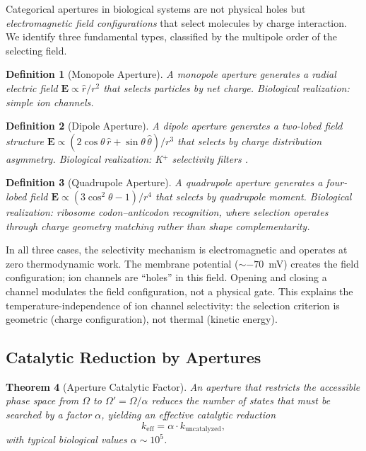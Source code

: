 \documentclass[twocolumn,10pt]{article}
\newtheorem{theorem}{Theorem}[section]
\newtheorem{definition}[theorem]{Definition}
\begin{document}
Categorical apertures in biological systems are not physical holes but \emph{electromagnetic field configurations} that select molecules by charge interaction.  We identify three fundamental types, classified by the multipole order of the selecting field.

\begin{definition}[Monopole Aperture]
A monopole aperture generates a radial electric field $\mathbf{E} \propto \hat{r}/r^{2}$ that selects particles by net charge.  Biological realization: simple ion channels.
\end{definition}

\begin{definition}[Dipole Aperture]
A dipole aperture generates a two-lobed field structure $\mathbf{E} \propto (2\cos\theta\,\hat{r} + \sin\theta\,\hat{\theta})/r^{3}$ that selects by charge distribution asymmetry.  Biological realization: K$^{+}$ selectivity filters \citep{doyle1998structure}.
\end{definition}

\begin{definition}[Quadrupole Aperture]
A quadrupole aperture generates a four-lobed field $\mathbf{E} \propto (3\cos^{2}\theta - 1)/r^{4}$ that selects by quadrupole moment.  Biological realization: ribosome codon--anticodon recognition, where selection operates through charge geometry matching rather than shape complementarity.
\end{definition}

In all three cases, the selectivity mechanism is electromagnetic and operates at zero thermodynamic work.  The membrane potential ($\sim\!{-70}$~mV) creates the field configuration; ion channels are ``holes'' in this field.  Opening and closing a channel modulates the field configuration, not a physical gate.  This explains the temperature-independence of ion channel selectivity: the selection criterion is geometric (charge configuration), not thermal (kinetic energy).

\subsection{Catalytic Reduction by Apertures}

\begin{theorem}[Aperture Catalytic Factor]
\label{thm:catalytic}
An aperture that restricts the accessible phase space from $\Omega$ to $\Omega' = \Omega / \alpha$ reduces the number of states that must be searched by a factor $\alpha$, yielding an effective catalytic reduction
\begin{equation}
  k_{\mathrm{eff}} = \alpha \cdot k_{\mathrm{uncatalyzed}},
  \label{eq:catalytic}
\end{equation}
with typical biological values $\alpha \sim 10^{5}$.
\end{theorem}
\end{document}
